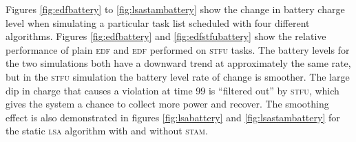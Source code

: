 Figures \ref{fig:edfbattery} to \ref{fig:lsastambattery} show the change in battery charge level when simulating a particular task list scheduled with four different algorithms.  
Figures \ref{fig:edfbattery} and \ref{fig:edfstfubattery} show the relative performance of plain \textsc{edf} and \textsc{edf} performed on \textsc{stfu} tasks.  The battery levels for the two simulations both have a downward trend at approximately the same rate, but in the \textsc{stfu} simulation the battery level rate of change is smoother.  
The large dip in charge that causes a violation at time 99 is ``filtered out'' by \textsc{stfu}, which gives the system a chance to collect more power and recover.  The smoothing effect is also demonstrated in figures \ref{fig:lsabattery} and \ref{fig:lsastambattery} for the static \textsc{lsa} algorithm with and without \textsc{stam}.




